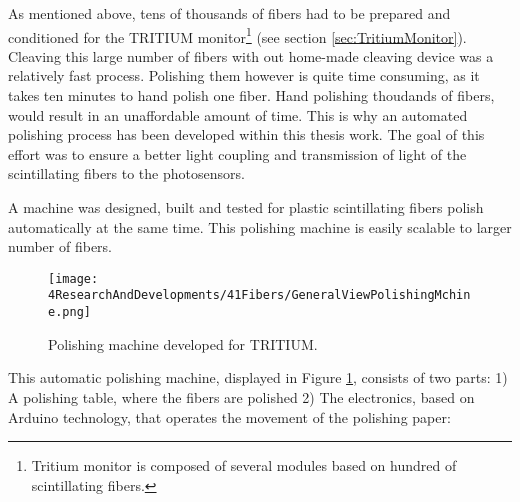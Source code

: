 As mentioned above, tens of thousands of fibers had to be prepared and conditioned for the TRITIUM monitor\footnote{Tritium monitor is composed of several modules based on hundred of scintillating fibers.} (see section \ref{sec:TritiumMonitor}). Cleaving this large number of fibers with out home-made cleaving device was a relatively fast process. Polishing them however is quite time consuming, as it takes ten minutes to hand polish one fiber. Hand polishing thoudands of fibers,  would result in an unaffordable amount of time. This is why an automated polishing process has been developed within this thesis work. The goal of this effort was to ensure a better light coupling and transmission of light of the scintillating fibers to the photosensors. 

A machine was designed, built and tested for plastic scintillating fibers polish automatically at the same time. This polishing machine is easily scalable to larger number of fibers.

\begin{figure}[h]
\centering
\texttt{[image: 4ResearchAndDevelopments/41Fibers/GeneralViewPolishingMchine.png]}
\caption{Polishing machine developed for TRITIUM.\label{fig:GeneralViewPolishingMachine}}
\end{figure}
This automatic polishing machine, displayed in Figure \ref{fig:GeneralViewPolishingMachine}, consists of two parts: 1) A polishing table, where the fibers are polished 2) The electronics, based on Arduino technology, that operates the movement of the polishing paper:

